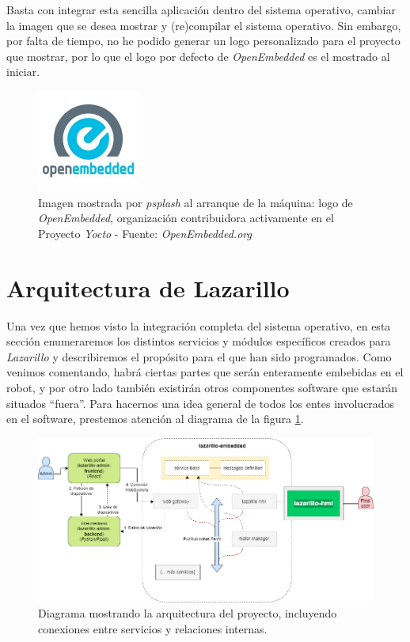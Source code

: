 Basta con integrar esta sencilla aplicación dentro del sistema operativo, cambiar la imagen que se desea mostrar y (re)compilar el sistema operativo. Sin embargo, por falta de tiempo, no he podido generar un logo personalizado para el proyecto que mostrar, por lo que el logo por defecto de \textit{OpenEmbedded} es el mostrado al iniciar.\\

\begin{figure}[h]
	\centering
	\includegraphics[width=0.3\textwidth]{imagenes/openembedded.jpg}
	\caption{Imagen mostrada por \textit{psplash} al arranque de la máquina: logo de \textit{OpenEmbedded}, organización contribuidora activamente en el Proyecto \textit{Yocto} - Fuente: \textit{OpenEmbedded.org} \cite{openembedded}}
\end{figure}


\section{Arquitectura de Lazarillo}

Una vez que hemos visto la integración completa del sistema operativo, en esta sección enumeraremos los distintos servicios y módulos específicos creados para \textit{Lazarillo} y describiremos el propósito para el que han sido programados. Como venimos comentando, habrá ciertas partes que serán enteramente embebidas en el robot, y por otro lado también existirán otros componentes software que estarán situados ``fuera''. Para hacernos una idea general de todos los entes involucrados en el software, prestemos atención al diagrama de la figura \ref{lazarillo-architecture}.\\

\begin{figure}[h]
	\label{lazarillo-architecture}
	\centering
	\includegraphics[width=\textwidth]{imagenes/lazarillo-architecture.png}
	\caption{Diagrama mostrando la arquitectura del proyecto, incluyendo conexiones entre servicios y relaciones internas.}
\end{figure}

